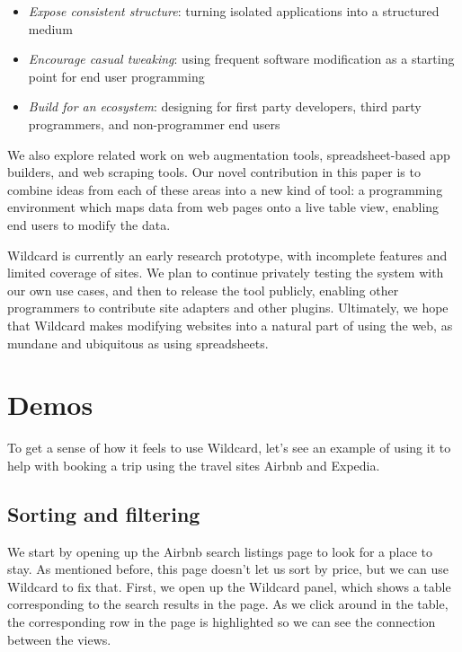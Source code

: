 \documentclass[english,submission]{programming}
\providecommand{\tightlist}{%
  \setlength{\itemsep}{0pt}\setlength{\parskip}{0pt}}
\begin{document}
\begin{itemize}
\tightlist
\item
  \emph{Expose consistent structure}: turning isolated applications into
  a structured medium
\item
  \emph{Encourage casual tweaking}: using frequent software modification
  as a starting point for end user programming
\item
  \emph{Build for an ecosystem}: designing for first party developers,
  third party programmers, and non-programmer end users
\end{itemize}

We also explore related work on web augmentation tools,
spreadsheet-based app builders, and web scraping tools. Our novel
contribution in this paper is to combine ideas from each of these areas
into a new kind of tool: a programming environment which maps data from
web pages onto a live table view, enabling end users to modify the data.

Wildcard is currently an early research prototype, with incomplete
features and limited coverage of sites. We plan to continue privately
testing the system with our own use cases, and then to release the tool
publicly, enabling other programmers to contribute site adapters and
other plugins. Ultimately, we hope that Wildcard makes modifying
websites into a natural part of using the web, as mundane and ubiquitous
as using spreadsheets.

\hypertarget{demos}{%
\section{Demos}\label{demos}}

To get a sense of how it feels to use Wildcard, let's see an example of
using it to help with booking a trip using the travel sites Airbnb and
Expedia.

\hypertarget{sorting-and-filtering}{%
\subsection{Sorting and filtering}\label{sorting-and-filtering}}

We start by opening up the Airbnb search listings page to look for a
place to stay. As mentioned before, this page doesn't let us sort by
price, but we can use Wildcard to fix that. First, we open up the
Wildcard panel, which shows a table corresponding to the search results
in the page. As we click around in the table, the corresponding row in
the page is highlighted so we can see the connection between the views.
\end{document}
